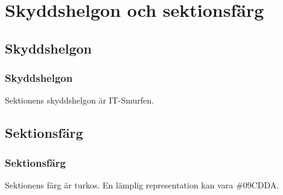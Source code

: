 \section{Skyddshelgon och sektionsfärg}

\subsection{Skyddshelgon}

\subsubsection{Skyddshelgon}
Sektionens skyddshelgon är IT-Smurfen.

\subsection{Sektionsfärg}

\subsubsection{Sektionsfärg}
Sektionens färg är turkos. En lämplig representation kan vara \#09CDDA.
